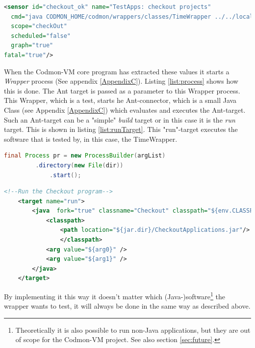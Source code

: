 \documentclass{article}
\newcommand{\project}{Codmon-VM}
\begin{document}
\begin{lstlisting}[frame=shadowbox, language=XML,showstringspaces=false]
<sensor id="checkout_ok" name="TestApps: checkout projects" 
  cmd="java CODMON_HOME/codmon/wrappers/classes/TimeWrapper ../../local/checkoutApplications run"  
  scope="checkOut" 
  scheduled="false" 
  graph="true" 
fatal="true"/>
\end{lstlisting} 

\noindent When the \project{} core program has extracted these values it starts a \emph{Wrapper} process (See appendix \ref{AppendixC}). Listing \ref{list:process} shows how this is done. The Ant target is 
passed as a parameter to this Wrapper process. This Wrapper, which is a test, starts he Ant-connector, which is a small Java Class (see Appendix \ref{AppendixC}) which evaluates and executes the Ant-target. 
Such an Ant-target can be a "simple" \emph{build} target or in this case it is the \emph{run} target. This is shown in listing \ref{list:runTarget}. This "run"-target executes the software that is tested by, 
in this case, the TimeWrapper.\\
 

\begin{lstlisting}[frame=shadowbox, language=Java,showstringspaces=false]
final Process pr = new ProcessBuilder(argList)
 		 .directory(new File(dir)) 
    		 .start();
\end{lstlisting} 


\begin{lstlisting}[frame=shadowbox, language=XML,showstringspaces=false]
	<!--Run the Checkout program-->
	<target name="run">
		<java  fork="true" classname="Checkout" classpath="${env.CLASSPATH}" output="out.txt">
	  		<classpath>
				<path location="${jar.dir}/CheckoutApplications.jar"/>
	        	</classpath>
			<arg value="${arg0}" />
			<arg value="${arg1}" />
		</java>
	</target>
\end{lstlisting} 

\noindent By implementing it this way it doesn't matter which (Java-)software\footnote{Theoretically it is also possible to run non-Java applications, but they are out of scope for the \project{} project. 
See also section \ref{sec:future}.} the wrapper wants to test, it will always be done in the same way as described above.
\end{document}
